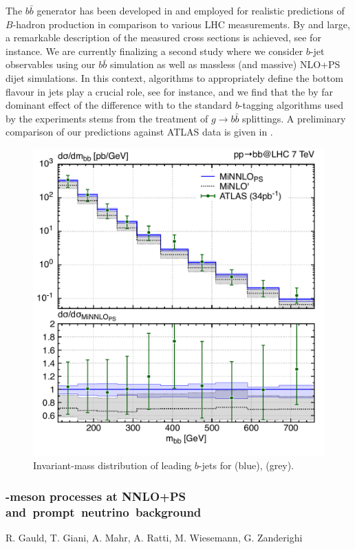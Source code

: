 \documentclass{FBR_Bericht_2025}
\begin{document}
\begin{refsection}
The $b\bar b$ \minnlo{}  generator has been developed in  and employed for 
realistic predictions of $B$-hadron production in comparison to various LHC measurements.
By and large, a remarkable description of the measured cross sections is achieved, 
see  for instance. We are currently finalizing a second study where we 
consider $b$-jet observables using our $b\bar b$ \minnlo{} simulation as
well as massless (and massive) NLO+PS dijet simulations. In this context, 
algorithms to appropriately define the bottom flavour in jets play a crucial role, see
 for instance, and we find that the by far dominant effect 
of the difference with to the standard $b$-tagging algorithms used by the experiments
stems from the treatment of $g\to b\bar b$ splittings.
A preliminary comparison of our \minnlo{} predictions against ATLAS data is given in 
.

\begin{figure}[t]
\begin{center}
\includegraphics[width=0.95\linewidth]{plots/bjet_mbb.pdf}
\caption{Invariant-mass distribution of leading $b$-jets for \minnlo{} (blue), \minlo{} (grey).}
\label{fig:bb}
\end{center}
\end{figure}
%
\subsubsection[$D$-meson processes at NNLO+PS and prompt neutrino background]{-meson processes at NNLO+PS \mbox{and prompt neutrino background}}
\begin{Namen}
R. Gauld, T. Giani, A. Mahr, A. Ratti, M. Wiesemann, G. Zanderighi
\end{Namen}


\end{refsection}
\end{document}
